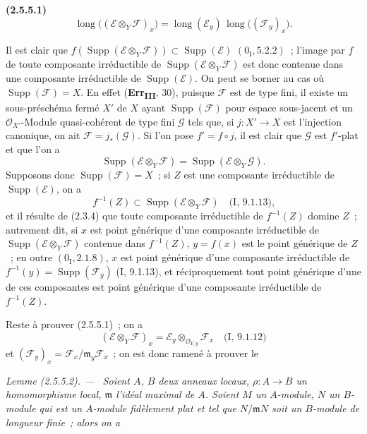 \documentclass[10pt,oneside]{book}
\newcommand{\oldpage}[2][]{%
  \setcounter{footnote}{0}%
  \marginpar{\scriptsize\textbf{#1}~|~#2}\ignorespaces}
\newenvironment{env}[1][]{\par\medskip\noindent\textbf{(#1)}\ }{\par}
\newenvironment{lemma}[1][]{%
  \par\medskip\noindent\itshape Lemme (#1). ---\ }{\par}
\begin{document}
\begin{env}[2.5.5.1]
\label{IV.2.5.5.1-fr}
\[
\operatorname{long}\bigl((\mathscr E\otimes_Y\mathscr F)_x\bigr)
=\operatorname{long}(\mathscr E_y)\,
 \operatorname{long}\bigl((\mathscr F_y)_x\bigr).
\]
\end{env}

Il est clair que
$f(\operatorname{Supp}(\mathscr E\otimes_Y\mathscr F))
\subset\operatorname{Supp}(\mathscr E)$ $(0_{\mathrm I},5.2.2)$~; l'image
par $f$ de toute composante irréductible de
$\operatorname{Supp}(\mathscr E\otimes_Y\mathscr F)$ est donc contenue dans
une composante irréductible de $\operatorname{Supp}(\mathscr E)$. On peut se
borner au cas où $\operatorname{Supp}(\mathscr F)=X$. En effet
(\textbf{Err}\textsubscript{\textbf{III}}, 30), puisque $\mathscr F$ est de
type fini, il existe un sous-préschéma fermé $X'$ de $X$ ayant
$\operatorname{Supp}(\mathscr F)$ pour espace sous-jacent et un
$\mathcal O_{X'}$-Module quasi-cohérent de type fini $\mathscr G$ tels que,
si $j:X'\to X$ est l'injection canonique, on ait
$\mathscr F=j_*(\mathscr G)$. Si l'on pose $f'=f\circ j$, il est clair que
$\mathscr G$ est $f'$-plat et que l'on a
\[
\operatorname{Supp}(\mathscr E\otimes_Y\mathscr F)
=\operatorname{Supp}(\mathscr E\otimes_Y\mathscr G).
\]
Supposons donc $\operatorname{Supp}(\mathscr F)=X$~; si $Z$ est une
composante irréductible de $\operatorname{Supp}(\mathscr E)$, on a
\[
f^{-1}(Z)\subset\operatorname{Supp}(\mathscr E\otimes_Y\mathscr F)
\quad\text{(I, 9.1.13),}
\]
et il résulte de (2.3.4) que toute composante irréductible de $f^{-1}(Z)$
domine $Z$~; autrement dit, si $x$ est point générique d'une composante
irréductible de $\operatorname{Supp}(\mathscr E\otimes_Y\mathscr F)$
contenue dans $f^{-1}(Z)$, $y=f(x)$ est le point générique de $Z$~; en outre
$(0_{\mathrm I},2.1.8)$, $x$ est point générique d'une composante
irréductible de
$f^{-1}(y)=\operatorname{Supp}(\mathscr F_y)$ (I, 9.1.13), et
réciproquement tout point générique d'une de ces composantes est point
générique d'une composante irréductible de $f^{-1}(Z)$.

\oldpage[IV-2]{24}
Reste à prouver (2.5.5.1)~; on a
\[
(\mathscr E\otimes_Y\mathscr F)_x
=\mathscr E_y\otimes_{\mathcal O_{Y,y}}\mathscr F_x
\quad\text{(I, 9.1.12)}
\]
et
$(\mathscr F_y)_x=\mathscr F_x/\mathfrak m_y\mathscr F_x$~; on est donc
ramené à prouver le

\begin{lemma}[2.5.5.2]
\label{IV.2.5.5.2-fr}
Soient $A$, $B$ deux anneaux locaux, $\rho:A\to B$ un homomorphisme local,
$\mathfrak m$ l'idéal maximal de $A$. Soient $M$ un $A$-module, $N$ un
$B$-module qui est un $A$-module fidèlement plat et tel que
$N/\mathfrak mN$ soit un $B$-module de longueur finie~; alors on a
\end{lemma}
\end{document}
